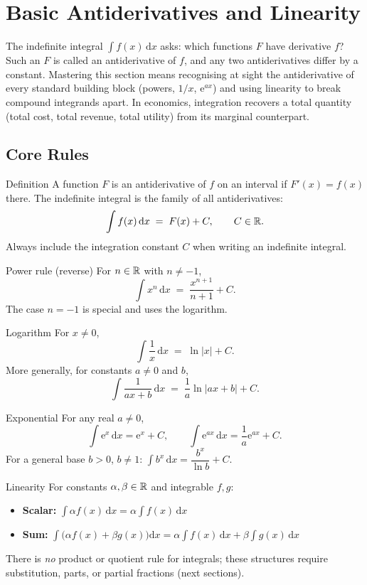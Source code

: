 \chapter{Basic Antiderivatives and Linearity}

The indefinite integral $\int f(x)\,\mathrm{d}x$ asks: which functions $F$
have derivative $f$? Such an $F$ is called an antiderivative of $f$, and any two antiderivatives differ by a
constant. Mastering this section means recognising at sight the
antiderivative of every standard building block (powers, $1/x$,
$\mathrm{e}^{ax}$) and using linearity to break compound integrands
apart. In economics, integration recovers a total quantity (total cost,
total revenue, total utility) from its marginal counterpart.

\section{Core Rules}

\begin{rulebox}{Definition}
A function $F$ is an antiderivative of $f$ on an interval if $F'(x)=f(x)$
there. The indefinite integral is the family of all antiderivatives:
\[
  \int f(x)\,\mathrm{d}x \;=\; F(x)+C,\qquad C\in\mathbb{R} .
\]
Always include the integration constant $C$ when writing an indefinite
integral.
\end{rulebox}

\begin{rulebox}{Power rule (reverse)}
For $n\in\mathbb{R}$ with $n\neq -1$,
\[
  \int x^{n}\,\mathrm{d}x \;=\; \frac{x^{n+1}}{n+1}+C .
\]
The case $n=-1$ is special and uses the logarithm.
\end{rulebox}

\begin{rulebox}{Logarithm}
For $x\neq 0$,
\[
  \int \frac{1}{x}\,\mathrm{d}x \;=\; \ln|x|+C .
\]
More generally, for constants $a\neq 0$ and $b$,
\[
  \int \frac{1}{ax+b}\,\mathrm{d}x \;=\; \frac{1}{a}\ln|ax+b|+C .
\]
\end{rulebox}

\begin{rulebox}{Exponential}
For any real $a\neq 0$,
\[
  \int \mathrm{e}^{x}\,\mathrm{d}x=\mathrm{e}^{x}+C,\qquad
  \int \mathrm{e}^{ax}\,\mathrm{d}x=\frac{1}{a}\mathrm{e}^{ax}+C .
\]
For a general base $b>0$, $b\neq 1$:
$\int b^{x}\,\mathrm{d}x=\dfrac{b^{x}}{\ln b}+C$.
\end{rulebox}

\begin{rulebox}{Linearity}
For constants $\alpha,\beta\in\mathbb{R}$ and integrable $f,g$:
\begin{itemize}[leftmargin=1.6em,itemsep=0.3ex]
  \item \textbf{Scalar:} $\displaystyle\int \alpha f(x)\,\mathrm{d}x
        =\alpha\int f(x)\,\mathrm{d}x$
  \item \textbf{Sum:} $\displaystyle\int\bigl(\alpha f(x)+\beta g(x)\bigr)\mathrm{d}x
        =\alpha\int f(x)\,\mathrm{d}x+\beta\int g(x)\,\mathrm{d}x$
\end{itemize}
There is \emph{no} product or quotient rule for integrals; these structures
require substitution, parts, or partial fractions (next sections).
\end{rulebox}

